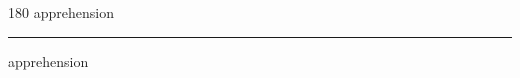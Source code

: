 
\begin{frame}
\begin{center}
\begin{turn}{180}
{\fontsize{2.5cm}{1em}\selectfont apprehension}
\end{turn}
\vspace{1em}\par  
\hrule
\vspace{1em}\par  
{\fontsize{2.5cm}{1em}\selectfont apprehension}
\end{center}
\end{frame}
